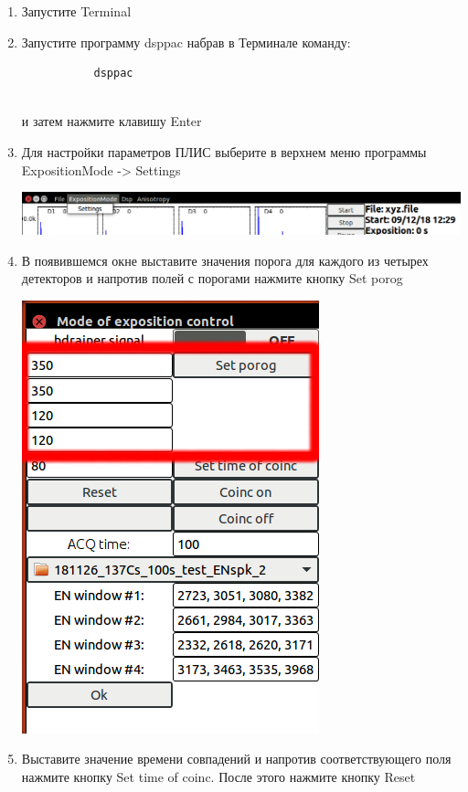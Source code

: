 \documentclass[]{article}
\begin{document}
\begin{enumerate}
\def\labelenumi{\arabic{enumi}.}
\item
  Запустите Terminal
\item
  Запустите программу dsppac набрав в Терминале команду:

\begin{verbatim}
           dsppac
         
\end{verbatim}

  и затем нажмите клавишу Enter
\item
  Для настройки параметров ПЛИС выберите в верхнем меню программы
  ExpositionMode -\textgreater{} Settings

  \includegraphics{./imgs/set_FPGA_Select_menu.png}
\item
  В появившемся окне выставите значения порога для каждого из четырех
  детекторов и напротив полей с порогами нажмите кнопку Set porog

  \includegraphics{./imgs/set_FPGA_Set_porog.png}
\item
  Выставите значение времени совпадений и напротив соответствующего поля
  нажмите кнопку Set time of coinc. После этого нажмите кнопку Reset


\end{enumerate}
\end{document}
